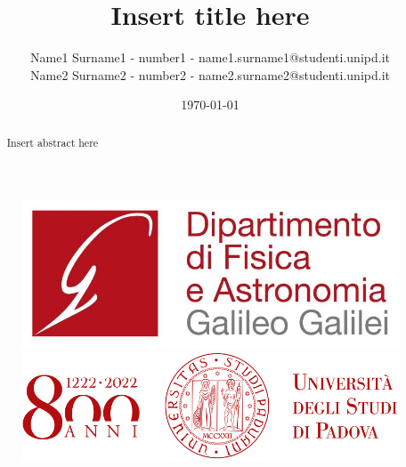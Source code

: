 \documentclass[rmp,10pt,onecolumn,fleqn,notitlepage]{revtex4-1}
\begin{document}

\begin{figure}[H]
\begin{minipage}{0.25\linewidth}
\includegraphics[width=\linewidth]{image/logo/logo_DFA.jpg}
\end{minipage}
\hfill
\begin{minipage}{0.35\linewidth}
\includegraphics[width=\textwidth]{image/logo/logo_800anni.png}
\end{minipage}
\end{figure}

\noindent\makebox[\linewidth]{\color{linescolor} \rule{0.85\paperwidth}{1.2 pt}}
\noindent\makebox[\linewidth]{\color{linescolor} \rule[0.3cm]{0.85\paperwidth}{1pt}}

\title{Insert title here}
\author{Name1 Surname1 - number1 - name1.surname1@studenti.unipd.it \\ Name2 Surname2 - number2 - name2.surname2@studenti.unipd.it}
\date{\today}

\begin{abstract}

Insert abstract here

\end{abstract}

\maketitle

\noindent\makebox[\linewidth]{\color{linescolor} \rule[0.1cm]{0.85\paperwidth}{1pt}}
\end{document}
